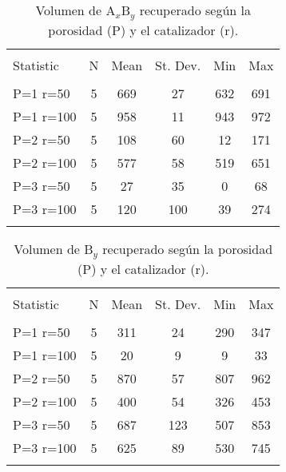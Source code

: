 \documentclass{article}
\begin{document}
\begin{table}[!htbp] \centering 
  \caption{Volumen de A$_x$B$_y$ recuperado según la porosidad (P) y el catalizador (r).} 
  \label{a} 
\begin{tabular}{@{\extracolsep{5pt}}lccccc} 
\\[-1.8ex]\hline 
\hline \\[-1.8ex] 
Statistic & \multicolumn{1}{c}{N} & \multicolumn{1}{c}{Mean} & \multicolumn{1}{c}{St. Dev.} & \multicolumn{1}{c}{Min} & \multicolumn{1}{c}{Max} \\ 
\hline \\[-1.8ex] 
P=1 r=50 & 5 & 669 & 27 & 632 & 691 \\ 
P=1 r=100 & 5 & 958 & 11 & 943 & 972 \\ 
P=2 r=50 & 5 & 108 & 60 & 12 & 171 \\ 
P=2 r=100 & 5 & 577 & 58 & 519 & 651 \\ 
P=3 r=50 & 5 & 27 & 35 & 0 & 68 \\ 
P=3 r=100 & 5 & 120 & 100 & 39 & 274 \\ 
\hline \\[-1.8ex] 
\end{tabular} 
\end{table} 

\begin{table}[!htbp] \centering 
  \caption{Volumen de B$_y$ recuperado según la porosidad (P) y el catalizador (r).} 
  \label{b} 
\begin{tabular}{@{\extracolsep{5pt}}lccccc} 
\\[-1.8ex]\hline 
\hline \\[-1.8ex] 
Statistic & \multicolumn{1}{c}{N} & \multicolumn{1}{c}{Mean} & \multicolumn{1}{c}{St. Dev.} & \multicolumn{1}{c}{Min} & \multicolumn{1}{c}{Max} \\ 
\hline \\[-1.8ex] 
P=1 r=50  & 5 & 311 & 24 & 290 & 347 \\ 
P=1 r=100  & 5 & 20 & 9 & 9 & 33 \\ 
P=2 r=50  & 5 & 870 & 57 & 807 & 962 \\ 
P=2 r=100  & 5 & 400 & 54 & 326 & 453 \\ 
P=3 r=50  & 5 & 687 & 123 & 507 & 853 \\ 
P=3 r=100 & 5 & 625 & 89 & 530 & 745 \\ 
\hline \\[-1.8ex] 
\end{tabular} 
\end{table} 
\end{document}
